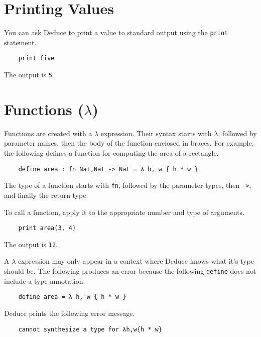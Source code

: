 \documentclass[12pt]{article}
\begin{document}
\section{Printing Values}

You can ask Deduce to print a value to standard output using the
\texttt{print} statement.

\begin{verbatim}
    print five
\end{verbatim}

\noindent The output is \texttt{5}.

\section{Functions ($\lambda$)}

Functions are created with a $\lambda$ expression.  Their syntax
starts with $\lambda$, followed by parameter names, then the body of
the function enclosed in braces.  For example, the following defines a
function for computing the area of a rectangle.

\begin{verbatim}
    define area : fn Nat,Nat -> Nat = λ h, w { h * w }
\end{verbatim}

\noindent The type of a function starts with \texttt{fn}, followed by
the parameter types, then \texttt{->}, and finally the return type.

To call a function, apply it to the appropriate number and type of
arguments.

\begin{verbatim}
    print area(3, 4)
\end{verbatim}

\noindent The output is \texttt{12}.

A $\lambda$ expression may only appear in a context where Deduce knows
what it's type should be. The following produces an error because the
following \texttt{define} does not include a type annotation.

\begin{verbatim}
    define area = λ h, w { h * w }
\end{verbatim}

\noindent Deduce prints the following error message.

\begin{verbatim}
    cannot synthesize a type for λh,w{h * w}
\end{verbatim}
\end{document}
